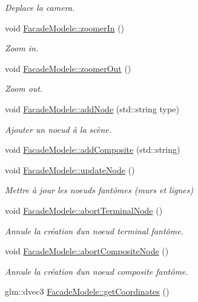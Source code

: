 \begin{DoxyCompactItemize}
\begin{DoxyCompactList}\small\item\em Deplace la camera. \end{DoxyCompactList}\item 
void \hyperlink{group__inf2990_ga8f027fa8ccba48bada7b91b1bc32ed96}{Facade\+Modele\+::zoomer\+In} ()
\begin{DoxyCompactList}\small\item\em Zoom in. \end{DoxyCompactList}\item 
void \hyperlink{group__inf2990_gaa2e1aeaa2fd10b16cf8b5f406d6270c8}{Facade\+Modele\+::zoomer\+Out} ()
\begin{DoxyCompactList}\small\item\em Zoom out. \end{DoxyCompactList}\item 
void \hyperlink{group__inf2990_ga22eeedd655650984efa7da6d3d2564eb}{Facade\+Modele\+::add\+Node} (std\+::string type)
\begin{DoxyCompactList}\small\item\em Ajouter un noeud à la scène. \end{DoxyCompactList}\item 
void \hyperlink{group__inf2990_ga84c93e92df125b294651c3bb04201624}{Facade\+Modele\+::add\+Composite} (std\+::string)
\item 
void \hyperlink{group__inf2990_ga3d780d2a98e5abe59033ba9791065d7d}{Facade\+Modele\+::update\+Node} ()
\begin{DoxyCompactList}\small\item\em Mettre à jour les noeuds fantômes (murs et lignes) \end{DoxyCompactList}\item 
void \hyperlink{group__inf2990_gaf1099ad811d94b7ede2572fbd3c7c89e}{Facade\+Modele\+::abort\+Terminal\+Node} ()
\begin{DoxyCompactList}\small\item\em Annule la création d\textquotesingle{}un noeud terminal fantôme. \end{DoxyCompactList}\item 
\hypertarget{group__inf2990_gaf17fbb34428b0e0a22ffcdc245e52d19}{}void \hyperlink{group__inf2990_gaf17fbb34428b0e0a22ffcdc245e52d19}{Facade\+Modele\+::abort\+Composite\+Node} ()\label{group__inf2990_gaf17fbb34428b0e0a22ffcdc245e52d19}

\begin{DoxyCompactList}\small\item\em Annule la création d\textquotesingle{}un noeud composite fantôme. \end{DoxyCompactList}\item 
\hypertarget{group__inf2990_ga4c28397e45d882d3d982ed68978e9e20}{}glm\+::dvec3 \hyperlink{group__inf2990_ga4c28397e45d882d3d982ed68978e9e20}{Facade\+Modele\+::get\+Coordinates} ()\label{group__inf2990_ga4c28397e45d882d3d982ed68978e9e20}


\end{DoxyCompactItemize}
